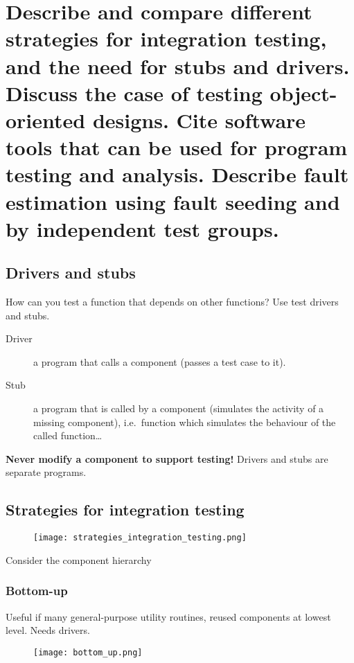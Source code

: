 \clearpage{}
\section{Describe and compare different strategies for integration testing,
and the need for stubs and drivers. Discuss the case of testing
object-oriented designs. Cite software tools that can be used for program
testing and analysis. Describe fault estimation using fault seeding and by
independent test groups.}

\subsection{Drivers and stubs}

How can you test a function that depends on other functions? \newline
Use test drivers and stubs.

\begin{description}
    \item[Driver] a program that calls a component (passes a test case to it).
    \item[Stub] a program that is called by a component (simulates the activity of a missing component), i.e.\ function which simulates the behaviour of the called function\ldots
\end{description}

\textbf{Never modify a component to support testing!} Drivers and stubs are separate programs.

\subsection{Strategies for integration testing}

\begin{figure}[!ht]
    \centering
    \texttt{[image: strategies\_integration\_testing.png]}
\end{figure}
Consider the component hierarchy

\subsubsection{Bottom-up}

Useful if many general-purpose utility routines, reused components at lowest level. \newline
Needs drivers.

\begin{figure}[!ht]
    \centering
    \texttt{[image: bottom\_up.png]}
\end{figure}


